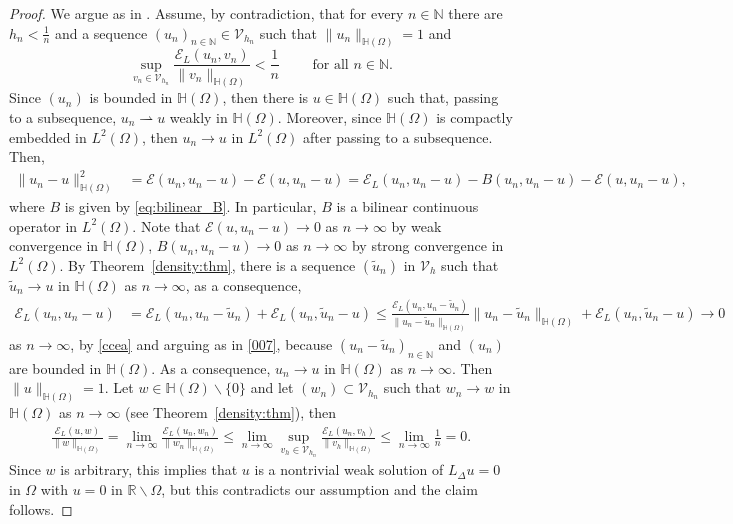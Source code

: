 \documentclass[11 pt]{article}
\numberwithin{equation}{section}
\def\N{\mathbb{N}}
\def\R{\mathbb{R}}
\def\cE{\mathcal{E}}
\begin{document}
\begin{proof}
We argue as in \cite[Theorem 4.2.1]{dem20}. Assume, by contradiction, that for every $n\in\N$ there are $h_n<\frac{1}{n}$ and a sequence $(u_n)_{n\in\N}\in \mathcal V_{h_n}$ such that $\|u_n\|_{\mathbb H(\Omega)}=1$ and
\begin{equation}\label{ccea}
    \sup_{v_n\in \mathcal V_{h_n}}\frac{\cE_{L}(u_n,v_n)}{\|v_n\|_{\mathbb H(\Omega)}}<\frac{1}{n}\qquad \text{ for all }n\in\N.
\end{equation}
Since $(u_n)$ is bounded in $\mathbb H(\Omega)$, then there is $u\in \mathbb H(\Omega)$ such that, passing to a subsequence, $u_n \rightharpoonup u$ weakly in $\mathbb H(\Omega)$. Moreover, since $\mathbb H(\Omega)$ is compactly embedded in $L^2(\Omega)$, then $u_n\to u$ in $L^2(\Omega)$ after passing to a subsequence.  Then,
\begin{align}
    \|u_n-u\|^2_{\mathbb H(\Omega)}
    &=\cE(u_n,u_n-u)-\cE(u,u_n-u)=\cE_L(u_n,u_n-u)-B(u_n,u_n-u)-\cE(u,u_n-u),\label{007}
\end{align}
where $B$ is given by \eqref{eq:bilinear_B}.  In particular, $B$ is a bilinear continuous operator in $L^2(\Omega)$.  Note that $\cE(u,u_n-u)\to 0$ as $n\to \infty$ by weak convergence in $\mathbb H(\Omega)$, $B(u_n,u_n-u)\to 0$ as $n\to \infty$ by strong convergence in $L^2(\Omega)$. By Theorem~\ref{density:thm}, there is a sequence $(\widetilde u_n)$ in $\mathcal V_h$ such that $\widetilde u_n\to u$ in $\mathbb H(\Omega)$ as $n\to \infty$, as a consequence,
\begin{align*}
    \cE_L(u_n,u_n-u)
    &=\cE_L(u_n,u_n-\widetilde u_n)+\cE_L(u_n,\widetilde u_n-u)
    \leq \frac{\cE_L(u_n,u_n-\widetilde u_n)}{\|u_n-\widetilde u_n\|_{\mathbb H(\Omega)}}\|u_n-\widetilde u_n\|_{\mathbb H(\Omega)}+\cE_L(u_n,\widetilde u_n-u) \to 0
\end{align*}
as $n\to \infty$, by \eqref{ccea} and arguing as in \eqref{007}, because $(u_n-\widetilde u_n)_{n\in\N}$ and $(u_n)$ are bounded in $\mathbb H(\Omega)$.  As a consequence, $u_n\to u$ in $\mathbb H(\Omega)$ as $n\to\infty$. Then $\|u\|_{\mathbb H(\Omega)}=1$. Let $w\in \mathbb H(\Omega)\backslash \{0\}$ and let $(w_n)\subset \mathcal V_{h_n}$ such that $w_n\to w$ in $\mathbb H(\Omega)$ as $n\to \infty$ (see Theorem~\ref{density:thm}), then
\begin{align*}
    \frac{\cE_{L}(u,w)}{\|w\|_{\mathbb H(\Omega)}}=\lim_{n\to\infty}\frac{\cE_{L}(u_n,w_n)}{\|w_n\|_{\mathbb H(\Omega)}}\leq \lim_{n\to\infty}\sup_{v_h\in \mathcal V_{h_n}}\frac{\cE_{L}(u_n,v_h)}{\|v_h\|_{\mathbb H(\Omega)}}\leq \lim_{n\to\infty}\frac{1}{n}=0.
\end{align*}
Since $w$ is arbitrary, this implies that $u$ is a nontrivial weak solution of $L_\Delta u=0$ in $\Omega$ with $u=0$ in $\R\backslash  \Omega$, but this contradicts our assumption and the claim follows. 
\end{proof}
\end{document}
